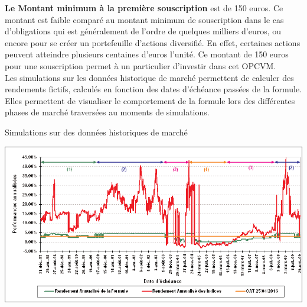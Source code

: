 \documentclass[french,12pt,a4paper]{article}
\begin{document}
\indent \textbf{Le Montant minimum à la première souscription} est de 150 euros. Ce montant est faible comparé au montant minimum de souscription dans le cas d'obligations qui est généralement de l'ordre de quelques milliers d'euros, ou encore pour se créer un portefeuille d'actions diversifié. En effet, certaines actions peuvent atteindre plusieurs centaines d'euros l'unité. Ce montant de 150 euros pour une souscription permet à un particulier d'investir dans cet OPCVM.\\
\indent Les simulations sur les données historique de marché permettent de calculer des rendements fictifs, calculés en fonction des dates d'échéance passées de la formule. Elles permettent de visualiser le comportement de la formule lors des différentes phases de marché traversées au moments de simulations.\\

\begin{center}
\caption{Simulations sur des données historiques de marché}
\end{center}

\begin{center}
\includegraphics[scale=0.5]{simulations_historiques.png}
\end{center}
\end{document}
